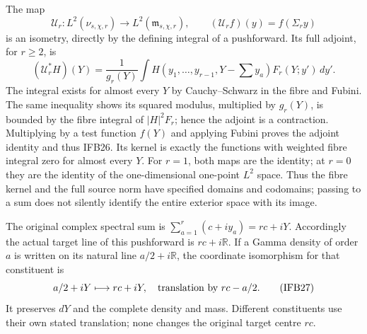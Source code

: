 The map
\[
 \mathcal U_r:L^2(\nu_{s,\chi,r})\longrightarrow
                 L^2(\mathfrak m_{s,\chi,r}),\qquad
 (\mathcal U_r f)(y)=f(\Sigma_r y)
 \tag{IFB25}
\]
is an isometry, directly by the defining integral of a pushforward.
Its full adjoint, for $r\geq2$, is
\[
 (\mathcal U_r^*H)(Y)
 =\frac1{g_r(Y)}\int H(y_1,\ldots,y_{r-1},Y-\textstyle\sum y_a)
                         F_r(Y;y')\,dy'.
 \tag{IFB26}
\]
The integral exists for almost every $Y$ by Cauchy--Schwarz in the
fibre and Fubini. The same inequality shows its squared modulus,
multiplied by $g_r(Y)$, is bounded by the fibre integral of
$|H|^2F_r$; hence the adjoint is a contraction. Multiplying by a
test function $f(Y)$ and applying Fubini proves the adjoint identity
and thus IFB26. Its kernel is exactly the functions with weighted
fibre integral zero for almost every $Y$. For $r=1$, both maps are
the identity; at $r=0$ they are the identity of the one-dimensional
one-point $L^2$ space. Thus the fibre kernel and the full source
norm have specified domains and codomains; passing to a sum does
not silently identify the entire exterior space with its image.

The original complex spectral sum is
$\sum_{a=1}^r(c+iy_a)=rc+iY$. Accordingly the actual target line
of this pushforward is $rc+i\mathbb R$. If a Gamma density of
order $a$ is written on its natural line $a/2+i\mathbb R$, the
coordinate isomorphism for that constituent is
\[
 a/2+iY\longmapsto rc+iY,
 \quad\hbox{translation by }rc-a/2.
 \tag{IFB27}
\]
It preserves $dY$ and the complete density and mass. Different
constituents use their own stated translation; none changes the
original target centre $rc$.

